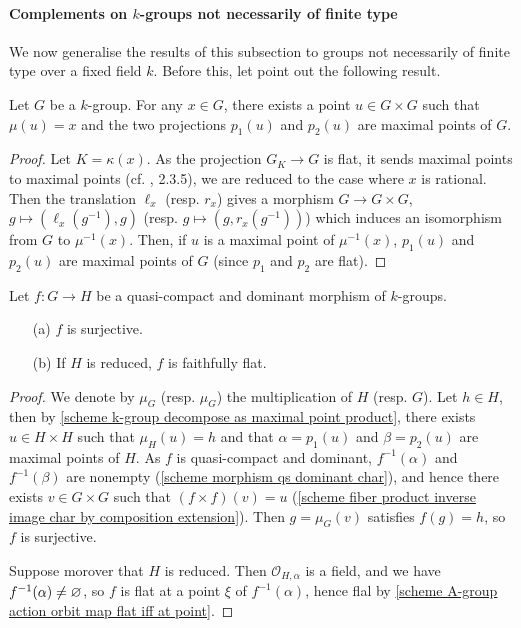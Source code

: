 \paragraph{Complements on $k$-groups not necessarily of finite type}
We now generalise the results of this subsection to groups not necessarily of finite type over a fixed field $k$. Before this, let point out the following result.

\begin{lemma}\label{scheme k-group decompose as maximal point product}
Let $G$ be a $k$-group. For any $x\in G$, there exists a point $u\in G\times G$ such that $\mu(u)=x$ and the two projections $p_1(u)$ and $p_2(u)$ are maximal points of $G$.
\end{lemma}
\begin{proof}
Let $K=\kappa(x)$. As the projection $G_K\to G$ is flat, it sends maximal points to maximal points (cf. \cite{EGA4-2}, 2.3.5), we are reduced to the case where $x$ is rational. Then the translation $\ell_x$ (resp. $r_x$) gives a morphism $G\to G\times G$, $g\mapsto(\ell_x(g^{-1}),g)$ (resp. $g\mapsto(g,r_x(g^{-1}))$) which induces an isomorphism from $G$ to $\mu^{-1}(x)$. Then, if $u$ is a maximal point of $\mu^{-1}(x)$, $p_1(u)$ and $p_2(u)$ are maximal points of $G$ (since $p_1$ and $p_2$ are flat).
\end{proof}

\begin{corollary}\label{scheme k-group morphism qc dominant surjective}
Let $f:G\to H$ be a quasi-compact and dominant morphism of $k$-groups.
\begin{enumerate}
    \item[(a)] $f$ is surjective.
    \item[(b)] If $H$ is reduced, $f$ is faithfully flat.
\end{enumerate}
\end{corollary}
\begin{proof}
We denote by $\mu_G$ (resp. $\mu_G$) the multiplication of $H$ (resp. $G$). Let $h\in H$, then by \cref{scheme k-group decompose as maximal point product}, there exists $u\in H\times H$ such that $\mu_H(u)=h$ and that $\alpha=p_1(u)$ and $\beta=p_2(u)$ are maximal points of $H$. As $f$ is quasi-compact and dominant, $f^{-1}(\alpha)$ and $f^{-1}(\beta)$ are nonempty (\cref{scheme morphism qs dominant char}), and hence there exists $v\in G\times G$ such that $(f\times f)(v)=u$ (\cref{scheme fiber product inverse image char by composition extension}). Then $g=\mu_G(v)$ satisfies $f(g)=h$, so $f$ is surjective.\par
Suppose morover that $H$ is reduced. Then $\mathscr{O}_{H,\alpha}$ is a field, and we have $f^{-1}(\alpha)\neq\varnothing$, so $f$ is flat at a point $\xi$ of $f^{-1}(\alpha)$, hence flal by \cref{scheme A-group action orbit map flat iff at point}.
\end{proof}

